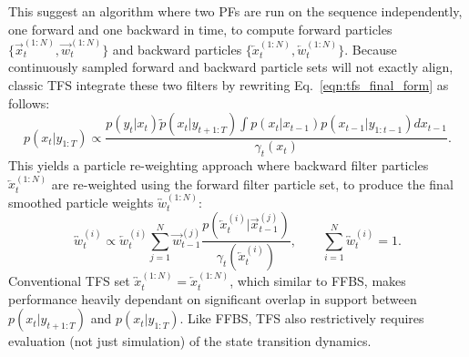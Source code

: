         This suggest an algorithm where two PFs are run on the sequence independently, one forward and one backward in time, to compute forward particles $\{\overrightarrow{x}_{t}^{(1:N)}, \overrightarrow{w}_{t}^{(1:N)}\}$ and backward particles $\{\overleftarrow{x}_{t}^{(1:N)}, \overleftarrow{w}_{t}^{(1:N)}\}$. %
        Because continuously sampled forward and backward particle sets will not exactly align, classic TFS integrate these two filters by rewriting 
        Eq.~\eqref{eqn:tfs_final_form} as follows:
        \begin{equation}
            p(x_t|y_{1:T}) \propto \frac{p(y_t|x_t)\tilde{p}(x_t| y_{t+1:T}) \int p(x_t|x_{t-1}) p(x_{t-1} | y_{1:t-1}) dx_{t-1}} {\gamma_t(x_t)}.
            \label{eq:tfsWeights}
        \end{equation}
        This yields a particle re-weighting approach where backward filter particles $\overleftarrow{x}_{t}^{(1:N)}$ are re-weighted using the forward filter particle set, to produce the final smoothed particle weights $\overleftrightarrow{w}_{t}^{(1:N)}$:
        \begin{equation}
            \overleftrightarrow{w}_{t}^{(i)} \propto \overleftarrow{w}_{t}^{(i)} \sum_{j=1}^N \overrightarrow{w}_{t-1}^{(j)} \frac{p(\overleftarrow{x}_{t}^{(i)} | \overrightarrow{x}_{t-1}^{(j)})}{\gamma_t(\overleftarrow{x}_{t}^{(i)})},
            \qquad \sum_{i=1}^{N} \overleftrightarrow{w}_{t}^{(i)} = 1.
        \end{equation}
        Conventional TFS set $\overleftrightarrow{x}_{t}^{(1:N)} = \overleftarrow{x}_{t}^{(1:N)}$, which similar to FFBS, makes performance heavily dependant on significant overlap in support between $p(x_t|y_{t+1:T})$ and $p(x_t|y_{1:T})$. Like FFBS, TFS also restrictively requires evaluation (not just simulation) of the state transition dynamics.
        
